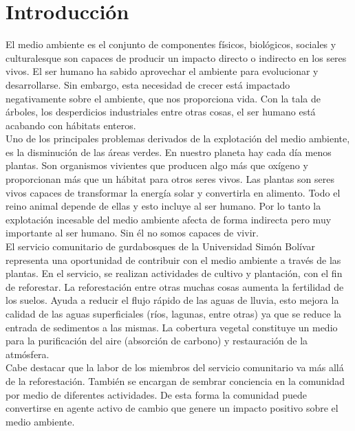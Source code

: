\chapter*{Introducción}

El medio ambiente es el conjunto de componentes físicos, biológicos, sociales y culturalesque son capaces de producir un impacto directo o indirecto en los seres vivos. El ser humano ha sabido aprovechar el ambiente para evolucionar y desarrollarse. Sin embargo, esta necesidad de crecer está impactado negativamente sobre el ambiente, que nos proporciona vida. Con la tala de árboles, los desperdicios industriales entre otras cosas, el ser humano está acabando con hábitats enteros.
\\  

Uno de los principales problemas derivados de la explotación del medio ambiente, es la disminución de las áreas verdes. En nuestro planeta hay cada día menos plantas. Son organismos vivientes que producen algo más que oxígeno y proporcionan más que un hábitat para otros seres vivos. Las plantas son seres vivos capaces de transformar la energía solar y convertirla en alimento. Todo el reino animal depende de ellas y esto incluye al ser humano. Por lo tanto la explotación incesable del medio ambiente afecta de forma indirecta pero muy importante al ser humano. Sin él no somos capaces de vivir.
\\

El servicio comunitario de gurdabosques de la Universidad Simón Bolívar representa una oportunidad de contribuir con el medio ambiente a través de las plantas. En el servicio, se realizan actividades de cultivo y plantación, con el fin de reforestar. La reforestación entre otras muchas cosas aumenta la fertilidad de los suelos. Ayuda a reducir el flujo rápido de las aguas de lluvia, esto mejora la calidad de las aguas superficiales (ríos, lagunas, entre otras) ya que se reduce la entrada de sedimentos a las mismas. La cobertura vegetal constituye un medio para la purificación del aire (absorción de carbono) y restauración de la atmósfera.
\\

Cabe destacar que la labor de los miembros del servicio comunitario va más allá de la reforestación. También se encargan de sembrar conciencia en la comunidad por medio de diferentes actividades. De esta forma la comunidad puede convertirse en agente activo de cambio que genere un impacto positivo sobre el medio ambiente.